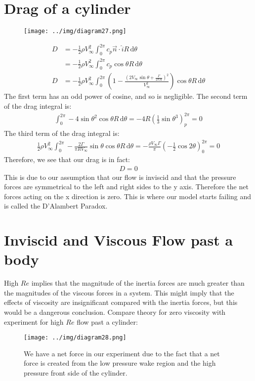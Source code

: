 \documentclass[class=report, crop=false, 12pt,a4paper]{standalone}
\begin{document}
\section{Drag of a cylinder}
\begin{figure}[H]
  \centering
  \texttt{[image: ../img/diagram27.png]}
\end{figure}
\begin{align}
  D &= -\frac{1}{2} \rho V_\infty^2 \int_{0}^{2\pi} c_p \vec{n}\cdot\hat{i} R \,\mathrm{d}\theta\\
  &= - \frac{1}{2} \rho V_\infty^2 \int_{0}^{2\pi} c_p \cos{\theta} R \,\mathrm{d}\theta \\
  D &= - \frac{1}{2} \rho V_\infty^2 \int_{0}^{2\pi} \left(1 - \frac{\left(2V_\infty \sin{\theta} + \frac{\Gamma}{2\pi R}\right)^2}{V_\infty^2}\right)\cos{\theta} R \,\mathrm{d}\theta 
\end{align}
The first term has an odd power of cosine, and so is negligible. The second term of the drag integral is:
\begin{align}
  \int_{0}^{2\pi} -4\sin{\theta}^2 \cos{\theta} R \,\mathrm{d}\theta = -4R \left(\frac{1}{3} \sin{\theta}^3\right)_p^{2\pi} = 0 
\end{align}
The third term of the drag integral is:
\begin{align}
  \frac{1}{2}\rho V_\infty^2 \int_{0}^{2\pi} -\frac{2\Gamma}{\pi R V_\infty}\sin{\theta}\cos{\theta} R \,\mathrm{d}\theta = - \frac{\rho V_\infty \Gamma}{\pi} \left(-\frac{1}{2} \cos{2\theta}\right)_0^{2\pi} = 0
\end{align}
Therefore, we see that our drag is in fact:
\begin{align}
  D = 0
\end{align}
This is due to our assumption that our flow is inviscid and that the pressure forces are symmetrical to the left and right sides to the y axis. Therefore the net forces acting on the x direction is zero. This is where our model starts failing and is called the D'Alambert Paradox.
\section{Inviscid and Viscous Flow past a body}
High $Re$ implies that the magnitude of the inertia forces are much greater than the magnitudes of the viscous forces in a system. This might imply that the effects of viscosity are insignificant compared with the inertia forces, but this would be a dangerous conclusion. Compare theory for zero viscosity with experiment for high $Re$ flow past a cylinder:
\begin{figure}[H]
  \centering
  \texttt{[image: ../img/diagram28.png]}
  \caption{We have a net force in our experiment due to the fact that a net force is created from the low pressure wake region and the high pressure front side of the cylinder.}
\end{figure}
\end{document}
